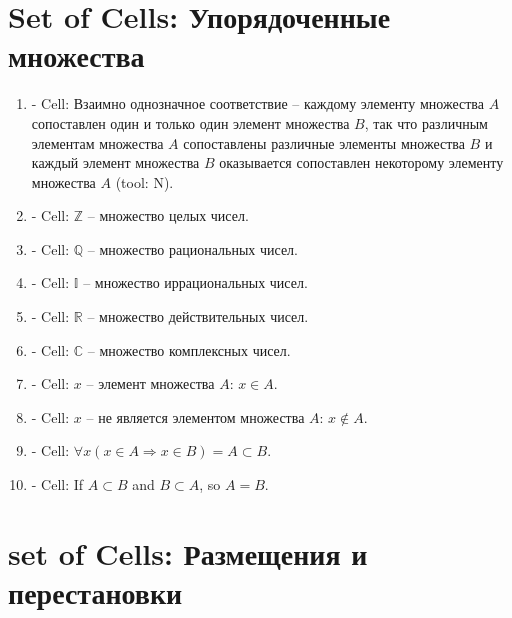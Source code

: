 \documentclass{spaceA}
\begin{document}
\section{Set of Cells: Упорядоченные множества}

\begin{enumerate}
  \item - Cell: Взаимно однозначное соответствие -- каждому элементу множества $A$ сопоставлен один и только один элемент множества $B$, так что различным элементам множества $A$ сопоставлены различные элементы множества $B$ и каждый элемент множества $B$ оказывается сопоставлен некоторому элементу множества $A$ (tool: N).
  \item - Cell: $\mathbb{Z}$ -- множество целых чисел.
  \item - Cell: $\mathbb{Q}$ -- множество рациональных чисел.
  \item - Cell: $\mathbb{I}$ -- множество иррациональных чисел.
  \item - Cell: $\mathbb{R}$ -- множество действительных чисел.
  \item - Cell: $\mathbb{C}$ -- множество комплексных чисел.
  \item - Cell: $x$ -- элемент множества $A$: $x \in A$.
  \item - Cell: $x$ -- не является элементом множества $A$: $x \notin A$.
  \item - Cell: $\forall x \left ( x \in A \Rightarrow x \in B \right ) = A \subset B$.
  \item - Cell: If $A \subset B$ and $B \subset A$, so $A = B$.
\end{enumerate}

\section{set of Cells: Размещения и перестановки}
\end{document}
